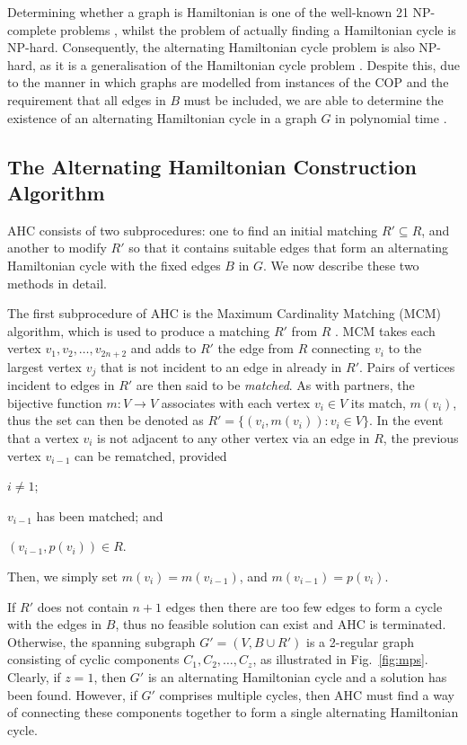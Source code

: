 \documentclass[authoryear]{elsarticle}
\begin{document}
Determining whether a graph is Hamiltonian is one of the well-known 21 NP-complete problems \cite{karp1972}, whilst the problem of actually finding a Hamiltonian cycle is NP-hard. Consequently, the alternating Hamiltonian cycle problem is also NP-hard, as it is a generalisation of the Hamiltonian cycle problem \citep{haggkvist1977}. Despite this, due to the manner in which graphs are modelled from instances of the COP and the requirement that all edges in $B$ must be included, we are able to determine the existence of an alternating Hamiltonian cycle in a graph $G$ in polynomial time \citep{hawa2018}.

\subsection{The Alternating Hamiltonian Construction Algorithm}
\label{sub:ahc}
\noindent AHC consists of two subprocedures: one to find an initial matching $R' \subseteq R$, and another to modify $R'$ so that it contains suitable edges that form an alternating Hamiltonian cycle with the fixed edges $B$ in $G$. We now describe these two methods in detail.

The first subprocedure of AHC is the Maximum Cardinality Matching (MCM) algorithm, which is used to produce a matching $R'$ from $R$ \citep{mahadev1994}. MCM takes each vertex $v_1, v_2,\dotsc,v_{2n+2}$ and adds to $R'$ the edge from $R$ connecting $v_i$ to the largest vertex $v_j$ that is not incident to an edge in already in $R'$. Pairs of vertices incident to edges in $R'$ are then said to be \emph{matched}. As with partners, the bijective function $m : V \to V$ associates with each vertex $v_i \in V$ its match, $m(v_i)$, thus the set can then be denoted as $R' = \{(v_i, m(v_i)): v_i \in V\}$. In the event that a vertex $v_i$ is not adjacent to any other vertex via an edge in $R$, the previous vertex $v_{i-1}$ can be rematched, provided 
\begin{enumerate*}[label={(\alph*)}]
	\item $i \neq 1$;
	\item $v_{i-1}$ has been matched; and
	\item $(v_{i-1}, p(v_i)) \in R$.
\end{enumerate*} 
Then, we simply set $m(v_i) = m(v_{i-1})$, and $m(v_{i-1}) = p(v_i)$. 

If $R'$ does not contain $n+1$ edges then there are too few edges to form a cycle with the edges in $B$, thus no feasible solution can exist and AHC is terminated. Otherwise, the spanning subgraph $G'=(V, B \cup R')$ is a 2-regular graph consisting of cyclic components $C_1,C_2,\dotsc,C_z$, as illustrated in Fig.~\ref{fig:mps}. Clearly, if $z = 1$, then $G'$ is an alternating Hamiltonian cycle and a solution has been found. However, if $G'$ comprises multiple cycles, then AHC must find a way of connecting these components together to form a single alternating Hamiltonian cycle.
\end{document}
